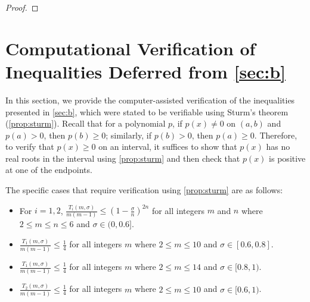 \documentclass{article}
\theoremstyle{plain}
\theoremstyle{definition}
\theoremstyle{remark}
\def\bigopen#1{\left(#1\right)}
\def\vzero{{\bm{0}}}
\def\mA{{\bm{A}}}
\def\mB{{\bm{B}}}
\DeclareMathOperator{\diag}{diag}
\begin{document}
\begin{proof}
    



\end{proof}
\newpage

\section{Computational Verification of Inequalities Deferred from \cref{sec:b}}
\label{sec:c}

In this section, we provide the computer-assisted verification of the inequalities presented in \cref{sec:b}, which were stated to be verifiable using Sturm's theorem (\cref{prop:sturm}). Recall that for a polynomial $p$, if $p(x) \ne 0$ on $(a, b)$ and $p(a) > 0$, then $p(b) \ge 0$; similarly, if $p(b) > 0$, then $p(a) \ge 0$. Therefore, to verify that $p(x) \ge 0$ on an interval, it suffices to show that $p(x)$ has no real roots in the interval using \cref{prop:sturm} and then check that $p(x)$ is positive at one of the endpoints.

The specific cases that require verification using \cref{prop:sturm} are as follows:
\begin{itemize}
    \item For $i=1,2$, $\frac{T_i(m,\sigma)}{m(m-1)} \le \bigopen{1-\frac{\sigma}{n}}^{2n}$ for all integers $m$ and $n$ where $2 \le m \le n \le 6$ and $\sigma \in (0, 0.6]$.
    \item $\frac{T_1(m,\sigma)}{m(m-1)} \le \frac{1}{4}$ for all integers $m$ where $2\le m\le 10$ and $\sigma \in [0.6, 0.8]$.
    \item $\frac{T_1(m,\sigma)}{m(m-1)} \le \frac{1}{4}$ for all integers $m$ where $2\le m\le 14$ and $\sigma \in [0.8, 1)$.
    \item $\frac{T_2(m,\sigma)}{m(m-1)} \le \frac{1}{4}$ for all integers $m$ where $2\le m\le 10$ and $\sigma \in [0.6, 1)$.
\end{itemize}
\end{document}
